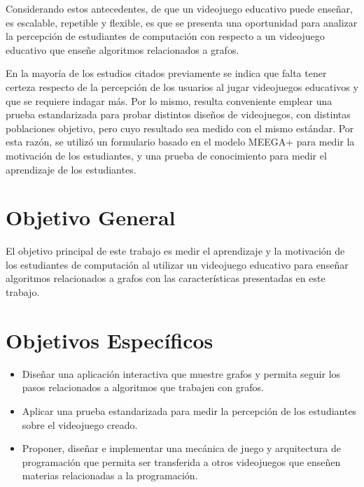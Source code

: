 Considerando estos antecedentes, de que un videojuego educativo puede enseñar, es escalable, repetible y flexible, es que se presenta una oportunidad para analizar la percepción de estudiantes de computación con respecto a un videojuego educativo que enseñe algoritmos relacionados a grafos.

En la mayoría de los estudios citados previamente se indica que falta tener certeza respecto de la percepción de los usuarios al jugar videojuegos educativos y que se requiere indagar más. Por lo mismo, resulta conveniente emplear una prueba estandarizada para probar distintos diseños de videojuegos, con distintas poblaciones objetivo, pero cuyo resultado sea medido con el mismo estándar. Por esta razón, se utilizó un formulario basado en el modelo MEEGA+ \cite{meegaplus} para medir la motivación de los estudiantes, y una prueba de conocimiento para medir el aprendizaje de los estudiantes.



\section{Objetivo General}

El objetivo principal de este trabajo es medir el aprendizaje y la motivación de los estudiantes de computación al 
utilizar un videojuego educativo para enseñar algoritmos relacionados a grafos con las características presentadas en este trabajo.

\section{Objetivos Específicos}

\begin{itemize}

\item Diseñar una aplicación interactiva que muestre grafos y permita seguir los pasos relacionados a
algoritmos que trabajen con grafos.

\item Aplicar una prueba estandarizada para medir la percepción de los estudiantes sobre el videojuego creado.

\item Proponer, diseñar e implementar una mecánica de juego y arquitectura de programación que permita ser transferida a 
otros videojuegos que enseñen materias relacionadas a la programación. 


\end{itemize}


